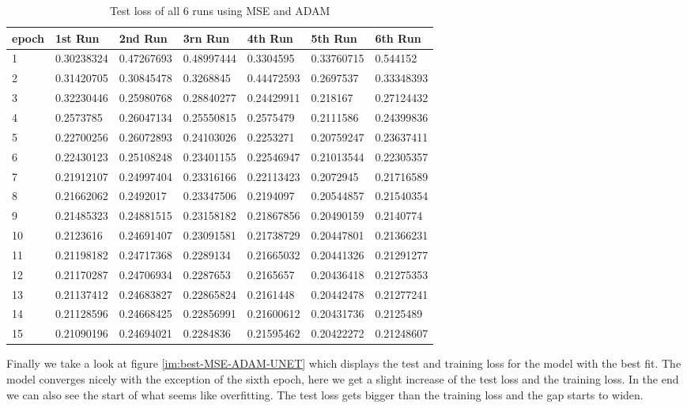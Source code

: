 \begin{table}[!ht]
    \centering
    \begin{tabular}{|l||l||l||l||l||l||l|}
    \hline
    epoch & 1st Run & 2nd Run & 3rn Run & 4th Run & 5th Run & 6th Run \\ \hline
        1 & 0.30238324 & 0.47267693 & 0.48997444 & 0.3304595 & 0.33760715 & 0.544152 \\ \hline
        2 & 0.31420705 & 0.30845478 & 0.3268845 & 0.44472593 & 0.2697537 & 0.33348393 \\ \hline
        3 & 0.32230446 & 0.25980768 & 0.28840277 & 0.24429911 & 0.218167 & 0.27124432 \\ \hline
        4 & 0.2573785 & 0.26047134 & 0.25550815 & 0.2575479 & 0.2111586 & 0.24399836 \\ \hline
        5 & 0.22700256 & 0.26072893 & 0.24103026 & 0.2253271 & 0.20759247 & 0.23637411 \\ \hline
        6 & 0.22430123 & 0.25108248 & 0.23401155 & 0.22546947 & 0.21013544 & 0.22305357 \\ \hline
        7 & 0.21912107 & 0.24997404 & 0.23316166 & 0.22113423 & 0.2072945 & 0.21716589 \\ \hline
        8 & 0.21662062 & 0.2492017 & 0.23347506 & 0.2194097 & 0.20544857 & 0.21540354 \\ \hline
        9 & 0.21485323 & 0.24881515 & 0.23158182 & 0.21867856 & 0.20490159 & 0.2140774 \\ \hline
        10 & 0.2123616 & 0.24691407 & 0.23091581 & 0.21738729 & 0.20447801 & 0.21366231 \\ \hline
        11 & 0.21198182 & 0.24717368 & 0.2289134 & 0.21665032 & 0.20441326 & 0.21291277 \\ \hline
        12 & 0.21170287 & 0.24706934 & 0.2287653 & 0.2165657 & 0.20436418 & 0.21275353 \\ \hline
        13 & 0.21137412 & 0.24683827 & 0.22865824 & 0.2161448 & 0.20442478 & 0.21277241 \\ \hline
        14 & 0.21128596 & 0.24668425 & 0.22856991 & 0.21600612 & 0.20431736 & 0.2125489 \\ \hline
        15 & 0.21090196 & 0.24694021 & 0.2284836 & 0.21595462 & 0.20422272 & 0.21248607 \\ \hline
    \end{tabular}
    \caption{\label{tab:mse_adam_test}Test loss of all 6 runs using MSE and ADAM}
\end{table}

Finally we take a look at figure \ref{im:best-MSE-ADAM-UNET} which displays the test and training
loss for the model with the best fit. The model converges nicely with the exception of the sixth epoch,
here we get a slight increase of the test loss and the training loss. In the end we can also see the start
of what seems like overfitting. The test loss gets bigger than the training loss and the gap starts to widen.

